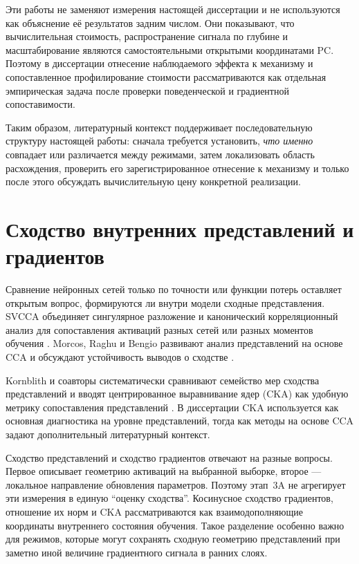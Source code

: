Эти работы не заменяют измерения настоящей диссертации и не используются как
объяснение её результатов задним числом. Они показывают, что вычислительная
стоимость, распространение сигнала по глубине и масштабирование являются
самостоятельными открытыми координатами PC. Поэтому в диссертации отнесение
наблюдаемого эффекта к механизму и сопоставленное профилирование стоимости
рассматриваются как отдельная эмпирическая задача после проверки поведенческой
и градиентной сопоставимости.

Таким образом, литературный контекст поддерживает последовательную структуру
настоящей работы: сначала требуется установить, \emph{что именно} совпадает или
различается между режимами, затем локализовать область расхождения, проверить
его зарегистрированное отнесение к механизму и только после этого обсуждать
вычислительную цену конкретной реализации.

\section{Сходство внутренних представлений и градиентов}
\label{sec:related-representations}

Сравнение нейронных сетей только по точности или функции потерь оставляет
открытым вопрос, формируются ли внутри модели сходные представления. SVCCA
объединяет сингулярное разложение и канонический корреляционный анализ для
сопоставления активаций разных сетей или разных моментов обучения
\cite{raghu2017svcca}. Morcos, Raghu и Bengio развивают анализ представлений на
основе CCA и обсуждают устойчивость выводов о сходстве
\cite{morcos2018insights}.

Kornblith и соавторы систематически сравнивают семейство мер сходства
представлений и вводят центрированное выравнивание ядер (CKA) как удобную
метрику сопоставления представлений \cite{kornblith2019similarity}. В
диссертации CKA используется как основная диагностика на уровне
представлений, тогда как методы на основе CCA задают дополнительный
литературный контекст.

Сходство представлений и сходство градиентов отвечают на разные вопросы. Первое
описывает геометрию активаций на выбранной выборке, второе --- локальное
направление обновления параметров. Поэтому этап~3A не агрегирует эти измерения
в единую ``оценку сходства''. Косинусное сходство градиентов, отношение их норм
и CKA рассматриваются как взаимодополняющие координаты внутреннего состояния
обучения. Такое разделение особенно важно для режимов, которые могут сохранять
сходную геометрию представлений при заметно иной величине градиентного сигнала
в ранних слоях.


